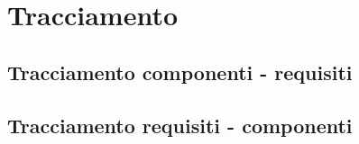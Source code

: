 \section{Tracciamento}


\subsection{Tracciamento componenti - requisiti}

\subsection{Tracciamento requisiti - componenti}